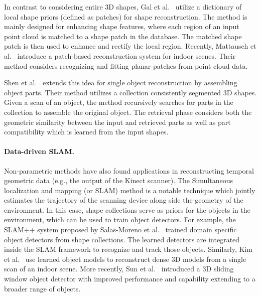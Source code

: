 In contrast to considering entire 3D shapes, Gal et al.~\cite{Gal:2007:SRU} utilize a dictionary of local shape priors (defined as patches) for shape reconstruction. The method is mainly designed for enhancing shape features, where each region of an input point cloud is matched to a shape patch in the database. The matched shape patch is then used to enhance and rectify the local region. Recently, Mattausch et al.~\cite{MATTAUSCH:2014:ODC} introduce a patch-based reconstruction system for indoor scenes. Their method considers recognizing and fitting planar patches from point cloud data.

Shen et al.~\cite{Shen:2012:SRP} extends this idea for single object reconstruction by assembling object parts. Their method utilizes a collection consistently segmented 3D shapes. Given a scan of an object, the method recursively searches for parts in the collection to assemble the original object. The retrieval phase considers both the geometric similarity between the input and retrieved parts as well as part compatibility which is learned from the input shapes.




\paragraph*{Data-driven SLAM.} Non-parametric methods have also found applications in reconstructing temporal geometric data (e.g., the output of the Kinect scanner). The Simultaneous localization and mapping (or SLAM) method is a notable technique which jointly estimates the trajectory of the scanning device along side the geometry of the environment. In this case, shape collections serve as priors for the objects in the environment, which can be used to train object detectors. For example, the SLAM++ system proposed by Salas-Moreno et al.~\cite{Salas-Moreno:2013:SLAM} trained domain specific object detectors from shape collections. The learned detectors are integrated inside the SLAM framework to recognize and track those objects. Similarly, Kim et al.~\cite{Kim:2012:AIE} use learned object models to reconstruct dense 3D models from a single scan of an indoor scene. More recently, Sun et al.~\cite{Sun:2014:SS} introduced a 3D sliding window object detector with improved performance and capability extending to a broader range of objects.

